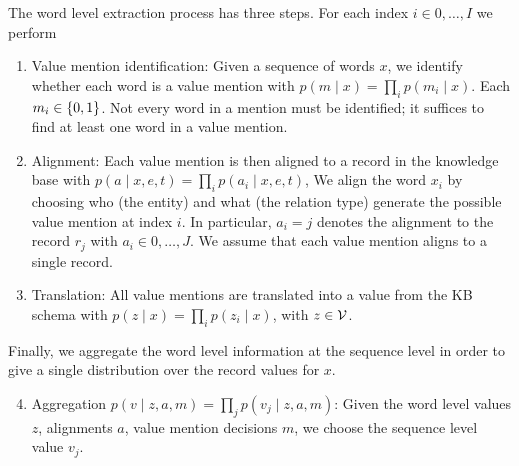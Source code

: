 \documentclass[12pt]{article}
\begin{document}
The word level extraction process has three steps.
For each index $i \in 0, \ldots, I$ we perform
\begin{enumerate}
\item Value mention identification: Given a sequence of words $x$,
    we identify whether each word is a value mention with
    $p(m \mid x) = \prod_i p(m_i \mid x)$.
    Each $m_i \in \left\{0,1\right\}$.
    Not every word in a mention must be identified; it suffices to find
    at least one word in a value mention.
\item Alignment: Each value mention is then aligned to a 
    record in the knowledge base with $p(a \mid x,e,t) = \prod_i p(a_i \mid x,e,t)$,
    We align the word $x_i$ by choosing who (the entity)
    and what (the relation type) generate the possible value mention at index $i$.
    In particular, $a_i = j$ denotes the alignment to the record $r_{j}$
    with $a_i \in 0, \ldots, J$.
    We assume that each value mention aligns to a single record.
\item Translation: All value mentions are translated
    into a value from the KB schema with
    $p(z \mid x) = \prod_i p(z_i \mid x)$, with $z \in \mathcal{V}$.
\end{enumerate}

Finally, we aggregate the word level information at the sequence level in order
to give a single distribution over the record values for $x$.
\begin{enumerate}
\setcounter{enumi}{3}
\item Aggregation $p(v \mid z,a,m) = \prod_j p(v_j \mid z,a,m)$:
    Given the word level values $z$, alignments $a$, value mention decisions $m$,
    we choose the sequence level value $v_j$.
\end{enumerate}
\end{document}
